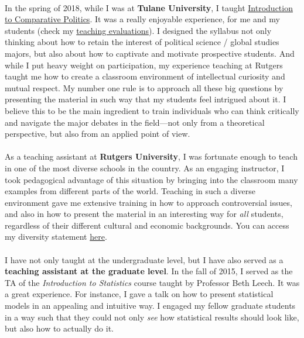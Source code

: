 \documentclass[letterpaper]{article}
\begin{document}
\paragraph{}In the spring of 2018, while I was at {\bf Tulane University}, I taught \href{https://github.com/hbahamonde/Comparative_Politics_UGRAD/raw/master/Bahamonde_Comparative_Politics_Syllabus_UGRAD.pdf}{Introduction to Comparative Politics}. It was a really enjoyable experience, for me and my students (check my \href{https://github.com/hbahamonde/Job_Market/raw/master/Bahamonde_Teaching_Portafolio.pdf}{teaching evaluations}). I designed the syllabus not only thinking about how to retain the interest of political science / global studies majors, but also about how to captivate and motivate prospective students. And while I put heavy weight on participation, my experience teaching at Rutgers taught me how to create a classroom environment of intellectual curiosity and mutual respect. My number one rule is to approach all these big questions by presenting the material in such way that my students feel intrigued about it. I believe this to be the main ingredient to train individuals who can think critically and navigate the major debates in the field---not only from a theoretical perspective, but also from an applied point of view.

\paragraph{}As a teaching assistant at {\bf Rutgers University}, I was fortunate enough to teach in one of the most diverse schools in the country. As an engaging instructor, I took pedagogical advantage of this situation by bringing into the classroom many examples from different parts of the world. Teaching in such a diverse environment gave me extensive training in how to approach controversial issues, and also in how to present the material in an interesting way for \emph{all} students, regardless of their different cultural and economic backgrounds. You can access my diversity statement \href{http://github.com/hbahamonde/Job_Market/raw/master/Bahamonde_Diversity_Statement.pdf}{here}.


\paragraph{}I have not only taught at the undergraduate level, but I have also served as a {\bf teaching assistant at the graduate level}. In the fall of 2015, I served as the TA of the \emph{Introduction to Statistics} course taught by Professor Beth Leech. It was a great experience. For instance, I gave a talk on how to present statistical models in an appealing and intuitive way. I engaged my fellow graduate students in a way such that they could not only \emph{see} how statistical results should look like, but also how to actually do it. 
\end{document}
